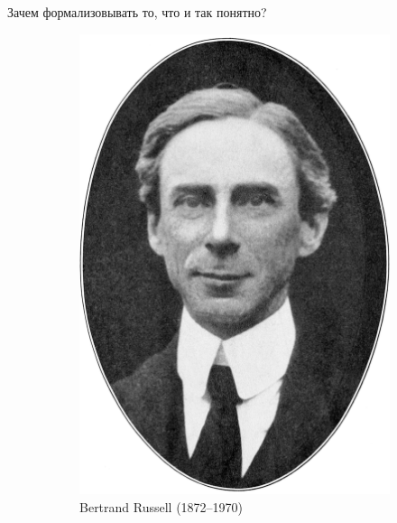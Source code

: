 \begin{frame}{Зачем формализовывать то, что и так понятно?}
\begin{figure}[t]
\begin{subfigure}[t]{0.55\textwidth}
  \end{subfigure}
\hspace{0.05\textwidth}
  \begin{subfigure}[t]{0.35\textwidth}
      \begin{minipage}{0.7\textwidth}
  \includegraphics[width=1\textwidth]{800px-Bertrand_Russell_transparent_bg.png}\\
  Bertrand Russell (1872–1970)
\end{minipage}
  \end{subfigure}
\end{figure}
\end{frame}

